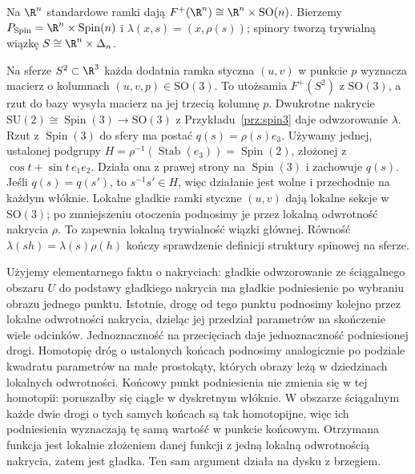 \begin{przyklad}
Na $\R^n$ standardowe ramki dają
$F^+(\R^n)\cong\R^n\times\mathrm{SO}(n)$.
Bierzemy
$P_{\mathrm{Spin}}=\R^n\times\operatorname{Spin}(n)$
i $\lambda(x,s)=(x,\rho(s))$; spinory
tworzą trywialną wiązkę
$S\cong\R^n\times\Delta_n$.

Na sferze $S^2\subset\R^3$ każda dodatnia
ramka styczna $(u,v)$ w punkcie $p$ wyznacza
macierz o kolumnach $(u,v,p)\in\mathrm{SO}(3)$.
To utożsamia $F^+(S^2)$ z $\mathrm{SO}(3)$,
a rzut do bazy wysyła macierz na jej trzecią
kolumnę $p$. Dwukrotne nakrycie
$\mathrm{SU}(2)\cong\operatorname{Spin}(3)
\to\mathrm{SO}(3)$ z
Przykładu~\ref{prz:spin3} daje odwzorowanie $\lambda$.
Rzut z $\operatorname{Spin}(3)$ do sfery ma postać
$q(s)=\rho(s)e_3$. Używamy jednej, ustalonej podgrupy
$H=\rho^{-1}(\operatorname{Stab}(e_3))=\operatorname{Spin}(2)$,
złożonej z $\cos t+\sin t\,e_1e_2$. Działa ona z prawej strony
na $\operatorname{Spin}(3)$ i zachowuje $q(s)$.
Jeśli $q(s)=q(s')$, to $s^{-1}s'\in H$, więc działanie jest
wolne i przechodnie na każdym włóknie. Lokalne gładkie ramki
styczne $(u,v)$ dają lokalne sekcje w $\mathrm{SO}(3)$;
po zmniejszeniu otoczenia podnosimy je przez lokalną odwrotność
nakrycia $\rho$. To zapewnia lokalną trywialność wiązki głównej.
Równość $\lambda(sh)=\lambda(s)\rho(h)$ kończy sprawdzenie
definicji struktury spinowej na sferze.
\end{przyklad}

\begin{uwaga}
\label{rem:spin-podnoszenie}
Użyjemy elementarnego faktu o nakryciach: gładkie odwzorowanie
ze ściągalnego obszaru $U$ do podstawy gładkiego nakrycia ma
gładkie podniesienie po wybraniu obrazu jednego punktu.
Istotnie, drogę od tego punktu podnosimy kolejno przez lokalne
odwrotności nakrycia, dzieląc jej przedział parametrów na skończenie
wiele odcinków. Jednoznaczność na przecięciach daje jednoznaczność
podniesionej drogi. Homotopię dróg o ustalonych końcach podnosimy
analogicznie po podziale kwadratu parametrów na małe prostokąty,
których obrazy leżą w dziedzinach lokalnych odwrotności.
Końcowy punkt podniesienia nie zmienia się w tej homotopii:
poruszałby się ciągle w dyskretnym włóknie. W obszarze ściągalnym
każde dwie drogi o tych samych końcach są tak homotopijne,
więc ich podniesienia wyznaczają tę samą wartość w punkcie końcowym.
Otrzymana funkcja jest lokalnie złożeniem danej funkcji z jedną
lokalną odwrotnością nakrycia, zatem jest gładka.
Ten sam argument działa na dysku z brzegiem.
\end{uwaga}

